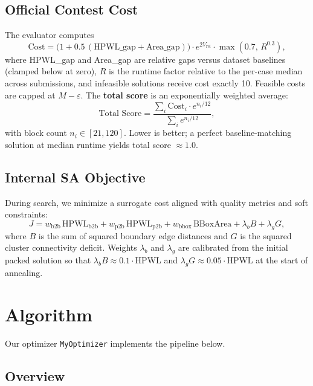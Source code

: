 \documentclass[11pt]{article}
\begin{document}
\subsection{Official Contest Cost}

The evaluator computes
\begin{equation}
\text{Cost} = \bigl(1 + 0.5\,(\text{HPWL\_gap} + \text{Area\_gap})\bigr) \cdot e^{2 V_{\text{rel}}} \cdot \max(0.7,\, R^{0.3}),
\end{equation}
where HPWL\_gap and Area\_gap are relative gaps versus dataset baselines (clamped below at zero), $R$ is the runtime factor relative to the per-case median across submissions, and infeasible solutions receive cost exactly 10. Feasible costs are capped at $M - \varepsilon$. The \textbf{total score} is an exponentially weighted average:
\begin{equation}
\text{Total Score} = \frac{\sum_i \text{Cost}_i \cdot e^{n_i/12}}{\sum_i e^{n_i/12}},
\end{equation}
with block count $n_i \in [21,120]$. Lower is better; a perfect baseline-matching solution at median runtime yields total score $\approx 1.0$.

\subsection{Internal SA Objective}

During search, we minimize a surrogate cost aligned with quality metrics and soft constraints:
\begin{equation}
J = w_{\text{b2b}}\,\text{HPWL}_{\text{b2b}} + w_{\text{p2b}}\,\text{HPWL}_{\text{p2b}} + w_{\text{bbox}}\,\text{BBoxArea} + \lambda_b B + \lambda_g G,
\end{equation}
where $B$ is the sum of squared boundary edge distances and $G$ is the squared cluster connectivity deficit. Weights $\lambda_b$ and $\lambda_g$ are calibrated from the initial packed solution so that $\lambda_b B \approx 0.1 \cdot \text{HPWL}$ and $\lambda_g G \approx 0.05 \cdot \text{HPWL}$ at the start of annealing.

\section{Algorithm}

Our optimizer \texttt{MyOptimizer} implements the pipeline below.

\subsection{Overview}
\end{document}
